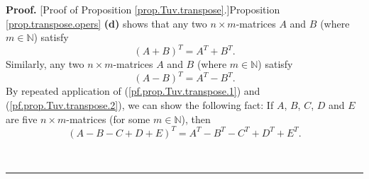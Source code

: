 \documentclass[numbers=enddot,12pt,final,onecolumn,notitlepage]{scrartcl}%
\theoremstyle{definition}
\newenvironment{proof}[1][Proof]{\noindent\textbf{#1.} }{\ \rule{0.5em}{0.5em}}
\begin{document}
\begin{proof}
[Proof of Proposition \ref{prop.Tuv.transpose}.]Proposition
\ref{prop.transpose.opers} \textbf{(d)} shows that any two $n\times
m$-matrices $A$ and $B$ (where $m\in\mathbb{N}$) satisfy%
\begin{equation}
\left(  A+B\right)  ^{T}=A^{T}+B^{T}. \label{pf.prop.Tuv.transpose.1}%
\end{equation}
Similarly, any two $n\times m$-matrices $A$ and $B$ (where $m\in\mathbb{N}$)
satisfy%
\begin{equation}
\left(  A-B\right)  ^{T}=A^{T}-B^{T}. \label{pf.prop.Tuv.transpose.2}%
\end{equation}
By repeated application of (\ref{pf.prop.Tuv.transpose.1}) and
(\ref{pf.prop.Tuv.transpose.2}), we can show the following fact: If $A$, $B$,
$C$, $D$ and $E$ are five $n\times m$-matrices (for some $m\in\mathbb{N}$),
then%
\begin{equation}
\left(  A-B-C+D+E\right)  ^{T}=A^{T}-B^{T}-C^{T}+D^{T}+E^{T}.
\label{pf.prop.Tuv.transpose.3}%
\end{equation}



\end{proof}
\end{document}
